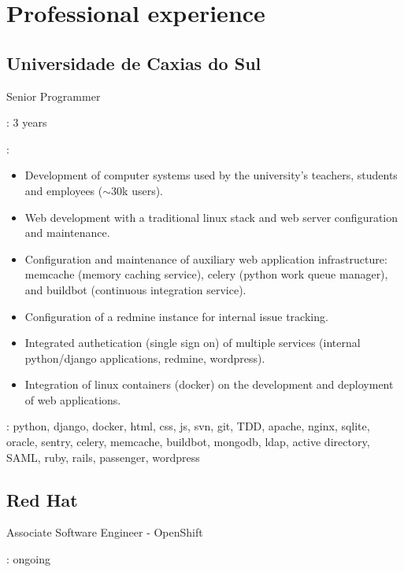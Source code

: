 \section*{Professional experience}
\subsection*{Universidade de Caxias do Sul}

Senior Programmer

\begin{description}[noitemsep]
    \item[Duration]: 3 years
    \item[Attributions]:
        \begin{itemize}[noitemsep]
            \item
                Development of computer systems used by the university's
                teachers, students and employees ($\sim$30k users).
            \item
                Web development with a traditional linux stack and web server
                configuration and maintenance.
            \item
                Configuration and maintenance of auxiliary web application
                infrastructure: memcache (memory caching service), celery
                (python work queue manager), and buildbot (continuous
                integration service).
            \item
                Configuration of a redmine instance for internal issue
                tracking.
            \item
                Integrated authetication (single sign on) of multiple services
                (internal python/django applications, redmine, wordpress).
            \item
                Integration of linux containers (docker) on the development
                and deployment of web applications.
        \end{itemize}
    \item[Technologies]:
        python, django, docker, html, css, js, svn, git, TDD, apache, nginx,
        sqlite, oracle, sentry, celery, memcache, buildbot, mongodb, ldap,
        active directory, SAML, ruby, rails, passenger, wordpress
\end{description}

\subsection*{Red Hat}

Associate Software Engineer - OpenShift

\begin{description}[noitemsep]
    \item[Duration]: ongoing
\end{description}
